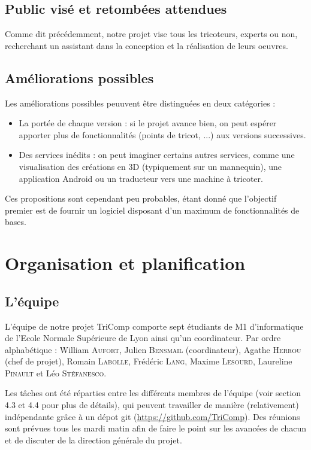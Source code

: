 \documentclass{article}
\begin{document}
\subsection{Public visé et retombées attendues}

Comme dit précédemment, notre projet vise tous les tricoteurs, experts ou non, recherchant un assistant dans la conception et la
réalisation de leurs oeuvres.

\subsection{Améliorations possibles}

Les améliorations possibles peuuvent être distinguées en deux catégories :
\begin{itemize}
   \item La portée de chaque version : si le projet avance bien, on peut espérer apporter plus de fonctionnalités (points de tricot, ...) 
aux versions successives. 
   \item Des services inédits : on peut imaginer certains autres services, comme une visualisation des créations 
en 3D (typiquement sur un mannequin), une application Android ou un traducteur vers une machine à tricoter.
\end{itemize}
Ces propositions sont cependant peu probables, étant donné que l'objectif premier est de fournir un logiciel disposant d'un maximum de fonctionnalités de bases.


\section{Organisation et planification}

\subsection{L'équipe}

L'équipe de notre projet TriComp comporte sept étudiants de M1 d'informatique de l'Ecole Normale Supérieure de Lyon ainsi qu'un coordinateur. Par ordre alphabétique : William \textsc{Aufort}, 
Julien \textsc{Bensmail} (coordinateur), Agathe \textsc{Herrou} (chef de projet), Romain \textsc{Labolle}, Frédéric \textsc{Lang}, Maxime 
\textsc{Lesourd}, Laureline \textsc{Pinault} et Léo \textsc{Stéfanesco}. \newline

Les tâches ont été réparties entre les différents membres de l'équipe (voir section 4.3 et 4.4 pour plus de détails), qui peuvent travailler de manière (relativement) indépendante grâce à un dépot git (\url{https://github.com/TriComp}). Des réunions sont prévues tous les mardi matin afin de faire le point sur les avancées de chacun et de discuter de la direction générale du projet.
\end{document}
